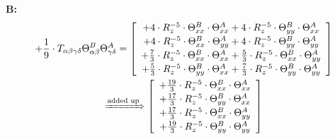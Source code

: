 \documentclass{article}
\begin{document}
\textbf{B:}
\begin{subequations}\begin{gather}
+ \frac{1}{9} \cdot T_{\alpha{}\beta{}\gamma{}\delta{}} \Theta{}^{B}_{\alpha{}\beta{}} \Theta{}^{A}_{\gamma{}\delta{}} =  \left[ \begin{array}{c} 
 		+ 4 \cdot R_{z}^{-5} \cdot \Theta{}^{B}_{xx} \cdot \Theta{}^{A}_{xx}+ 4 \cdot R_{z}^{-5} \cdot \Theta{}^{B}_{yy} \cdot \Theta{}^{A}_{xx} 
 \\[0.2em] 		 + 4 \cdot R_{z}^{-5} \cdot \Theta{}^{B}_{xx} \cdot \Theta{}^{A}_{yy}+ 4 \cdot R_{z}^{-5} \cdot \Theta{}^{B}_{yy} \cdot \Theta{}^{A}_{yy} 
 \\[0.2em] 		 + \frac{7}{3} \cdot R_{z}^{-5} \cdot \Theta{}^{B}_{xx} \cdot \Theta{}^{A}_{xx}+ \frac{5}{3} \cdot R_{z}^{-5} \cdot \Theta{}^{B}_{xx} \cdot \Theta{}^{A}_{yy} 
 \\[0.2em] 		 + \frac{5}{3} \cdot R_{z}^{-5} \cdot \Theta{}^{B}_{yy} \cdot \Theta{}^{A}_{xx}+ \frac{7}{3} \cdot R_{z}^{-5} \cdot \Theta{}^{B}_{yy} \cdot \Theta{}^{A}_{yy}
 \end{array}\right] 
\\ \xRightarrow{\text{added up}}
  \left[ \begin{array}{c} 
 		+ \frac{19}{3} \cdot R_{z}^{-5} \cdot \Theta{}^{B}_{xx} \cdot \Theta{}^{A}_{xx} 
 \\[0.2em] 		 + \frac{17}{3} \cdot R_{z}^{-5} \cdot \Theta{}^{B}_{yy} \cdot \Theta{}^{A}_{xx} 
 \\[0.2em] 		 + \frac{17}{3} \cdot R_{z}^{-5} \cdot \Theta{}^{B}_{xx} \cdot \Theta{}^{A}_{yy} 
 \\[0.2em] 		 + \frac{19}{3} \cdot R_{z}^{-5} \cdot \Theta{}^{B}_{yy} \cdot \Theta{}^{A}_{yy}
 \end{array}\right] 
\end{gather}\end{subequations}
\end{document}
